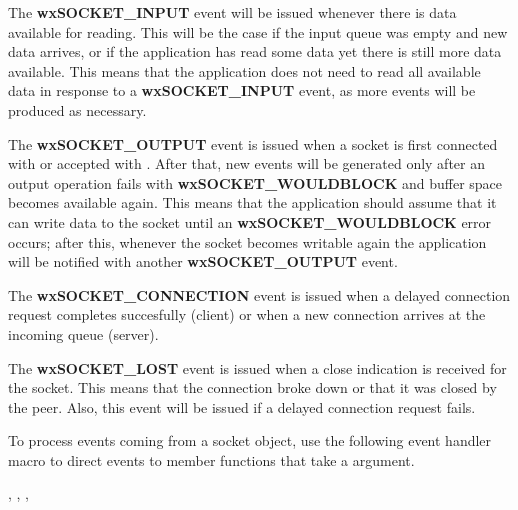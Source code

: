 The {\bf wxSOCKET\_INPUT} event will be issued whenever there is data
available for reading. This will be the case if the input queue was
empty and new data arrives, or if the application has read some data
yet there is still more data available. This means that the application
does not need to read all available data in response to a 
{\bf wxSOCKET\_INPUT} event, as more events will be produced as
necessary.

The {\bf wxSOCKET\_OUTPUT} event is issued when a socket is first
connected with  or accepted
with . After that, new
events will be generated only after an output operation fails
with {\bf wxSOCKET\_WOULDBLOCK} and buffer space becomes available
again. This means that the application should assume that it
can write data to the socket until an {\bf wxSOCKET\_WOULDBLOCK} 
error occurs; after this, whenever the socket becomes writable
again the application will be notified with another 
{\bf wxSOCKET\_OUTPUT} event.

The {\bf wxSOCKET\_CONNECTION} event is issued when a delayed connection
request completes succesfully (client) or when a new connection arrives
at the incoming queue (server).

The {\bf wxSOCKET\_LOST} event is issued when a close indication is
received for the socket. This means that the connection broke down or
that it was closed by the peer. Also, this event will be issued if
a delayed connection request fails.


To process events coming from a socket object, use the following event
handler macro to direct events to member functions that take a
 argument.

\twocolwidtha{7cm}%
\begin{twocollist}\itemsep=0pt
\end{twocollist}


, 
, 
, 


